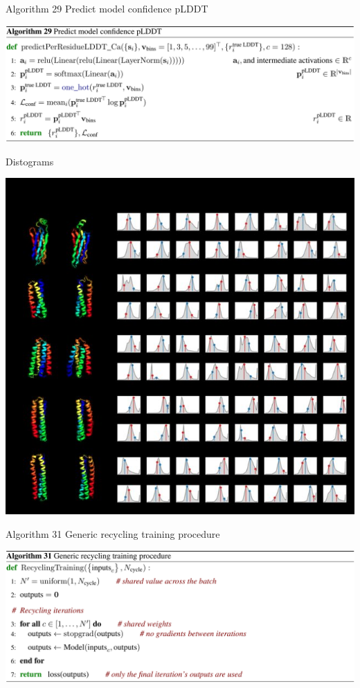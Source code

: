 \documentclass[presentation, smaller]{beamer}
\begin{document}
\begin{frame}[label={sec:org8eba1c7}]{Algorithm 29 Predict model confidence pLDDT \cite{jumperHighlyAccurateProtein2021}}
\begin{center}
\includegraphics[width=.9\linewidth]{./imgs/confidence-pLDDT-algo29.png}
\end{center}
\end{frame}
\begin{frame}[label={sec:org963bd98}]{Distograms \cite{jumperHighlyAccurateProtein2021}}
\begin{center}
\includegraphics[height=\textheight]{./imgs/Examples-of-distograms-from-trRosetta.jpg}
\end{center}
\end{frame}
\begin{frame}[label={sec:orgaa37153}]{Algorithm 31 Generic recycling training procedure \cite{jumperHighlyAccurateProtein2021}}
\begin{center}
\includegraphics[width=.9\linewidth]{./imgs/generic-recycling-algo31.png}
\end{center}
\end{frame}
\end{document}
